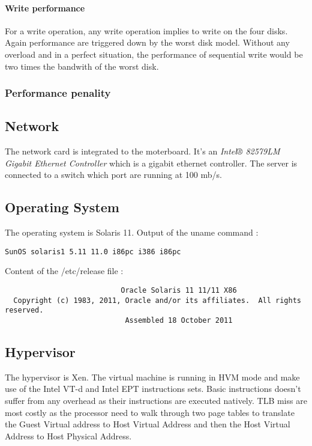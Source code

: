 \paragraph{Write performance}
For a write operation, any write operation implies to write on the four disks.
Again performance are triggered down by the worst disk model.
Without any overload and in a perfect situation, the performance of sequential
write would be two times the bandwith of the worst disk.

\subsubsection{Performance penality}

\subsection{Network}
The network card is integrated to the moterboard. It's an \emph{Intel® 82579LM Gigabit
Ethernet Controller} which is a gigabit ethernet controller.
The server is connected to a switch which port are running at 100 mb/s.

\subsection{Operating System}
The operating system is Solaris 11.
Output of the uname command :
\begin{verbatim}
SunOS solaris1 5.11 11.0 i86pc i386 i86pc
\end{verbatim}
Content of the /etc/release file :
\begin{verbatim}
                           Oracle Solaris 11 11/11 X86
  Copyright (c) 1983, 2011, Oracle and/or its affiliates.  All rights reserved.
                            Assembled 18 October 2011
\end{verbatim}

\subsection{Hypervisor}
The hypervisor is Xen.
The virtual machine is running in HVM mode and make use of the Intel VT-d and
Intel EPT instructions sets.
Basic instructions doesn't suffer from any overhead as their instructions are
executed natively.
TLB miss are most costly as the processor need to walk through two page tables
to translate the Guest Virtual address to Host Virtual Address and then the Host
Virtual Address to Host Physical Address.
